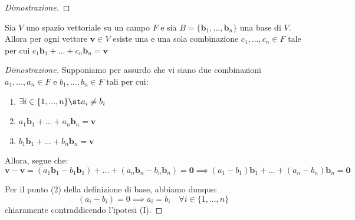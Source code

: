 \begin{proof}[Dimostrazione]
        \vspace{10pt}

    \end{proof}

    \vspace{10pt}
    \begin{theorem} \label{thm:uniqueness_of_combination}
        Sia $V$ uno spazio vettoriale su un campo $F$ e sia $B = \{\mathbf{b}_{1},...,\mathbf{b}_{n}\}$ una base di $V$.
        Allora per ogni vettore $\mathbf{v} \in V$ esiste una e una sola combinazione $c_1,...,c_n \in F$ tale per cui $c_1\mathbf{b}_{1} + ... + c_n\mathbf{b}_{n} = \mathbf{v}$
    \end{theorem}

    \begin{proof}[Dimostrazione]
        Supponiamo per assurdo che vi siano due combinazioni $a_1,...,a_n \in F$ e $b_1,...,b_n \in F$ tali per cui:
        \begin{enumerate}[label=(\Roman*)]
            \item $\exists i \in \{1,...,n\} \st a_i \neq b_i$
            \item $a_1\mathbf{b}_{1} + ... + a_n\mathbf{b}_{n} = \mathbf{v}$
            \item $b_1\mathbf{b}_{1} + ... + b_n\mathbf{b}_{n} = \mathbf{v}$
        \end{enumerate}

        Allora, segue che:
        \[
            \mathbf{v} - \mathbf{v} = (a_1\mathbf{b}_{1} - b_1\mathbf{b}_{1}) + ... + (a_n\mathbf{b}_{n} - b_n\mathbf{b}_{n}) = \mathbf{0} \implies (a_1 - b_1) \mathbf{b}_{1} + ... + (a_n - b_n) \mathbf{b}_{n} = \mathbf{0}
        \]

        Per il punto (2) della definizione di base, abbiamo dunque:
        \[
            (a_i - b_i) = 0 \implies a_i = b_i \quad \forall i \in \{1,...,n\}
        \]
        chiaramente contraddicendo l'ipotesi (I).
    \end{proof}

